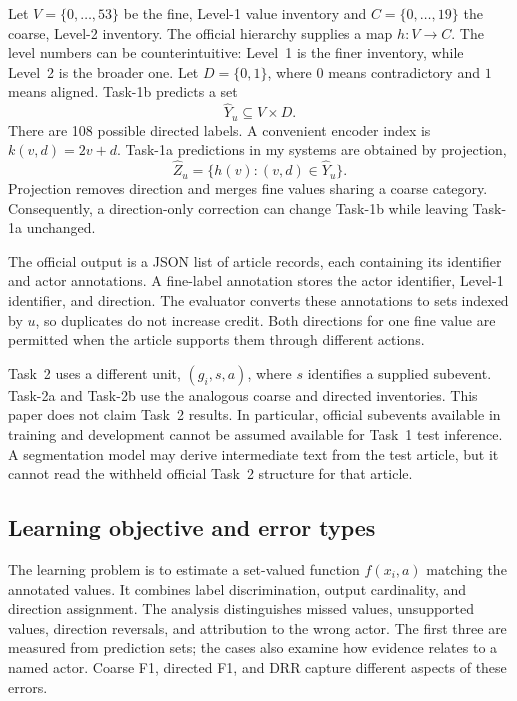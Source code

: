 \documentclass[12pt,a4paper]{article}
\begin{document}
Let $V=\{0,\ldots,53\}$ be the fine, Level-1 value inventory and $C=\{0,\ldots,19\}$ the coarse, Level-2 inventory. The official hierarchy supplies a map $h:V\rightarrow C$. The level numbers can be counterintuitive: Level~1 is the finer inventory, while Level~2 is the broader one. Let $D=\{0,1\}$, where $0$ means contradictory and $1$ means aligned. Task-1b predicts a set
\begin{equation}
\widehat{Y}_u\subseteq V\times D.
\label{eq:output}
\end{equation}
There are 108 possible directed labels. A convenient encoder index is $k(v,d)=2v+d$. Task-1a predictions in my systems are obtained by projection,
\begin{equation}
\widehat{Z}_u=\{h(v):(v,d)\in\widehat{Y}_u\}.
\label{eq:projection}
\end{equation}
Projection removes direction and merges fine values sharing a coarse category. Consequently, a direction-only correction can change Task-1b while leaving Task-1a unchanged.

The official output is a JSON list of article records, each containing its identifier and actor annotations. A fine-label annotation stores the actor identifier, Level-1 identifier, and direction. The evaluator converts these annotations to sets indexed by $u$, so duplicates do not increase credit. Both directions for one fine value are permitted when the article supports them through different actions.

Task~2 uses a different unit, $(g_i,s,a)$, where $s$ identifies a supplied subevent. Task-2a and Task-2b use the analogous coarse and directed inventories. This paper does not claim Task~2 results. In particular, official subevents available in training and development cannot be assumed available for Task~1 test inference. A segmentation model may derive intermediate text from the test article, but it cannot read the withheld official Task~2 structure for that article.

\subsection{Learning objective and error types}
The learning problem is to estimate a set-valued function $f(x_i,a)$ matching the annotated values. It combines label discrimination, output cardinality, and direction assignment. The analysis distinguishes missed values, unsupported values, direction reversals, and attribution to the wrong actor. The first three are measured from prediction sets; the cases also examine how evidence relates to a named actor. Coarse F1, directed F1, and DRR capture different aspects of these errors.
\end{document}
